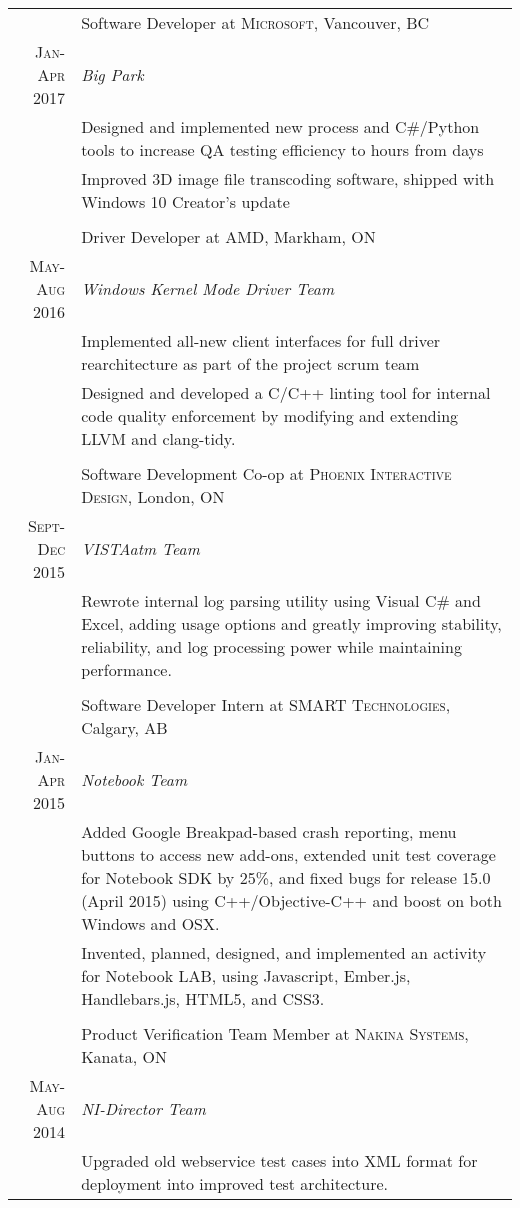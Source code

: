 \documentclass[a4paper,10pt]{article}
\begin{document}
\begin{tabular}{r|p{15.4cm}}
& Software Developer at \textsc{Microsoft}, Vancouver, BC \\ \textsc{Jan-Apr 2017} & \emph{Big Park}\\
&\footnotesize{Designed and implemented new process and C\#\slash Python tools to increase QA testing efficiency to hours from days}\\
&\footnotesize{Improved 3D image file transcoding software, shipped with Windows 10 Creator's update}\\

\multicolumn{2}{c}{} \\
& Driver Developer at \textsc{AMD}, Markham, ON \\ \textsc{May-Aug 2016} & \emph{Windows Kernel Mode Driver Team}\\
&\footnotesize{Implemented all-new client interfaces for full driver rearchitecture as part of the project scrum team}\\
&\footnotesize{Designed and developed a C\slash C++ linting tool for internal code quality enforcement by modifying and extending LLVM and clang-tidy.}\\

\multicolumn{2}{c}{} \\
& Software Development Co-op at \textsc{Phoenix Interactive Design}, London, ON\\
\textsc{Sept-Dec 2015} & \emph{VISTAatm Team}\\
&\footnotesize{Rewrote internal log parsing utility using Visual C\# and Excel, adding usage options and greatly improving stability, reliability, and log processing power while maintaining performance.}\\

\multicolumn{2}{c}{}\\
& Software Developer Intern at \textsc{SMART Technologies}, Calgary, AB \\
\textsc{Jan-Apr 2015}&\emph{Notebook Team}\\
&\footnotesize{
Added Google Breakpad-based crash reporting, menu buttons to access new add-ons, extended unit test coverage for Notebook SDK by 25\%, and fixed bugs for release 15.0 (April 2015) using C++/Objective-C++ and boost on both Windows and OSX.}\\
&\footnotesize{Invented, planned, designed, and implemented an activity for Notebook LAB, using Javascript, Ember.js, Handlebars.js, HTML5, and CSS3.
}\\

\multicolumn{2}{c}{} \\
& Product Verification Team Member at \textsc{Nakina Systems}, Kanata, ON \\
\textsc{May-Aug 2014} & \emph{NI-Director Team}\\
&\footnotesize{Upgraded old webservice test cases into XML format for deployment into improved test architecture.}\\
 
\end{tabular}
\end{document}
